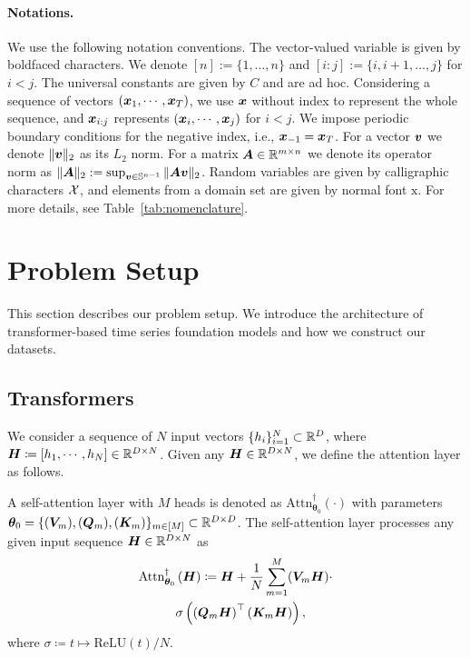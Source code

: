 \paragraph{Notations.}
We use the following notation conventions. 
The vector-valued variable is given by boldfaced characters. 
We denote $[n]:=\{1,\ldots,n\}$ and $[i:j]:=\{i,i+1,\ldots, j\}$ for $i<j$. 
The universal constants are given by $C$ and are ad hoc. 
Considering a sequence of vectors $(\bm{x}_1, \cdots, \bm{x}_T)$, we use $\bm{x}$ without index to represent the whole sequence, and $\bm{x}_{i:j}$ represents $(\bm{x}_i, \cdots, \bm{x}_j)$ for $i < j$.
We impose periodic boundary conditions for the negative index, i.e., $\bm{x}_{-1} = \bm{x}_{T}$.
For a vector $\boldsymbol{v}$ we denote $\Vert\boldsymbol{v}\Vert_2$ as its $L_2$ norm. 
For a matrix $\boldsymbol{A}\in  \mathbb{R}^{m\times n}$ we denote its operator norm as $\Vert\boldsymbol{A}\Vert_2:=\sup_{\boldsymbol{v}\in \mathbb{S}^{n-1}}\Vert\boldsymbol{A}\boldsymbol{v}\Vert_2$. 
Random variables are given by calligraphic characters $\mathcal{X}$, and elements from a domain set are given by normal font $\text{x}$.
For more details, see Table~\ref{tab:nomenclature}.

\section{Problem Setup}
This section describes our problem setup.
We introduce the architecture of transformer-based time series foundation models and how we construct our datasets.
\subsection{Transformers}
We consider a sequence of $N$ input vectors $\{ h_i \}_{i=1}^N \subset \mathbb{R}^D$, where $ \boldsymbol{H} \coloneqq \left[ h_1, \cdots, h_N \right] \in \mathbb{R}^{D \times N}$.
Given any $ \boldsymbol{H} \in \mathbb{R}^{D \times N}$, we define the attention layer as follows.
\begin{definition}\label{def:attn}
    {\normalfont
    A self-attention layer with $M$ heads is denoted as $\text{Attn}^{\dagger}_{\bm{\theta}_0}(\cdot)$ with parameters $\bm{\theta}_0 = \{ (\boldsymbol{V}_m), (\boldsymbol{Q}_m), (\boldsymbol{K}_m)  \}_{m \in [M]} \subset \mathbb{R}^{D \times D}$.
    The self-attention layer processes any given input sequence $\boldsymbol{H} \in \mathbb{R}^{D \times N}$ as
    }
    \begin{align*}
    \text{Attn}_{\bm{\theta}_0}^{\dagger} 
    &\left( \boldsymbol{H} \right)
    \coloneqq
    \boldsymbol{H} + 
    \frac{1}{N}
    \sum_{m=1}^M
    (\boldsymbol{V}_m \boldsymbol{H})
    \cdot
    \\
    &\sigma 
    \left( 
    \left( \boldsymbol{Q}_m \boldsymbol{H} \right)^\top 
    \left(\boldsymbol{K}_m \boldsymbol{H} \right) 
    \right),  
\end{align*}
where $\sigma \coloneqq t \mapsto \text{ReLU}(t)/N$.
\end{definition}
